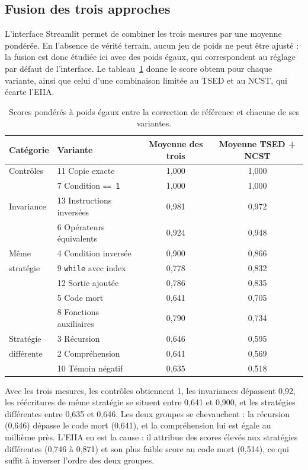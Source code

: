 \documentclass[12pt,a4paper,oneside]{report}
\begin{document}
\subsection{Fusion des trois approches}
\label{sec:fusion_variantes}

L'interface Streamlit permet de combiner les trois mesures par une moyenne
pondérée. En l'absence de vérité terrain, aucun jeu de poids ne peut être
ajusté : la fusion est donc étudiée ici avec des poids égaux, qui
correspondent au réglage par défaut de l'interface. Le
tableau~\ref{tab:fusion_variantes} donne le score obtenu pour chaque
variante, ainsi que celui d'une combinaison limitée au TSED et au NCST, qui
écarte l'EIIA.

\begin{table}[htbp]
\centering
\small
\renewcommand{\arraystretch}{1.15}
\begin{tabular}{llcc}
\toprule
\textbf{Catégorie} & \textbf{Variante} &
\textbf{Moyenne des trois} & \textbf{Moyenne TSED + NCST} \\
\midrule
Contrôles  & 11 Copie exacte & 1,000 & 1,000 \\
           & 7 Condition \texttt{== 1} & 1,000 & 1,000 \\
\midrule
Invariance & 13 Instructions inversées & 0,981 & 0,972 \\
           & 6 Opérateurs équivalents & 0,924 & 0,948 \\
\midrule
Même       & 4 Condition inversée & 0,900 & 0,866 \\
stratégie  & 9 \texttt{while} avec index & 0,778 & 0,832 \\
           & 12 Sortie ajoutée & 0,786 & 0,835 \\
           & 5 Code mort & 0,641 & 0,705 \\
           & 8 Fonctions auxiliaires & 0,790 & 0,734 \\
\midrule
Stratégie  & 3 Récursion & 0,646 & 0,595 \\
différente & 2 Compréhension & 0,641 & 0,569 \\
           & 10 Témoin négatif & 0,635 & 0,518 \\
\bottomrule
\end{tabular}
\caption{Scores pondérés à poids égaux entre la correction de référence et
chacune de ses variantes.}
\label{tab:fusion_variantes}
\end{table}

Avec les trois mesures, les contrôles obtiennent 1, les invariances
dépassent 0,92, les réécritures de même stratégie se situent entre 0,641 et
0,900, et les stratégies différentes entre 0,635 et 0,646. Les deux groupes
se chevauchent : la récursion (0,646) dépasse le code mort (0,641), et la
compréhension lui est égale au millième près. L'EIIA en est la cause : il
attribue des scores élevés aux stratégies différentes (0,746 à 0,871) et son
plus faible score au code mort (0,514), ce qui suffit à inverser l'ordre des
deux groupes.
\end{document}
